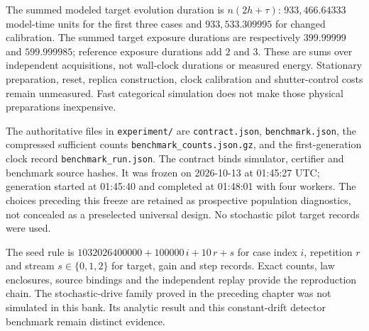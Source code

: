 The summed modeled target evolution duration is $n(2h+\tau)$:
$933{,}466.64333$ model-time units for the first three cases and
$933{,}533.309995$ for changed calibration.  The summed target exposure
durations are respectively $399.99999$ and $599.999985$; reference exposure
durations add $2$ and $3$.  These are sums over independent acquisitions,
not wall-clock durations or measured energy.  Stationary preparation, reset,
replica construction, clock calibration and shutter-control costs remain
unmeasured.  Fast categorical simulation does not make those physical
preparations inexpensive.

The authoritative files in \texttt{experiment/} are \texttt{contract.json},
\texttt{benchmark.json}, the compressed sufficient counts
\texttt{benchmark\_counts.json.gz}, and the first-generation
clock record \texttt{benchmark\_run.json}.  The contract binds
simulator, certifier and benchmark source hashes.  It was frozen on
2026-10-13 at 01:45:27 UTC; generation started at 01:45:40 and completed at
01:48:01 with four workers.  The choices preceding this freeze are retained
as prospective population diagnostics, not concealed as a preselected
universal design.  No stochastic pilot target records were used.

The seed rule is
$1032026400000+100000\,i+10\,r+s$ for case index $i$, repetition $r$ and
stream $s\in\{0,1,2\}$ for target, gain and step records.  Exact counts,
law enclosures, source bindings and the independent replay provide the
reproduction chain.  The stochastic-drive family proved in the preceding
chapter was not simulated in this bank.  Its analytic result and this
constant-drift detector benchmark remain distinct evidence.

